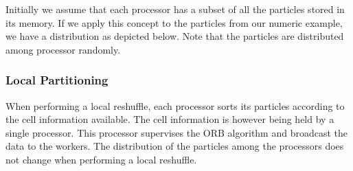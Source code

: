 \documentclass[]{article}
\begin{document}
Initially we assume that each processor has a subset of all the particles stored in its memory. If we apply this concept to the particles from our numeric example, we have a distribution as depicted below. Note that the particles are distributed among processor randomly.


\begin{figure}[ht]
	
	\centering
	
\end{figure}

\subsubsection{Local Partitioning}

When performing a local reshuffle, each processor sorts its particles according to the cell information available. The cell information is however being held by a single processor. This processor supervises the ORB algorithm and broadcast the data to the workers. The distribution of the particles among the processors does not change when performing a local reshuffle.
\end{document}
